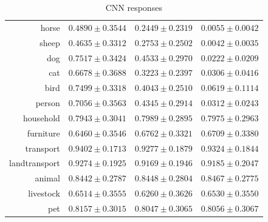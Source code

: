 \documentclass[11pt,a4paper]{article}
\begin{document}
\begin{table}[htbp]
\begin{tabular}{r|c|c|c}
horse         & $0.4890\pm0.3544$ & $0.2449\pm0.2319$ & $0.0055\pm0.0042$\\
sheep         & $0.4635\pm0.3312$ & $0.2753\pm0.2502$ & $0.0042\pm0.0035$\\
dog           & $0.7517\pm0.3424$ & $0.4533\pm0.2970$ & $0.0222\pm0.0209$\\
cat           & $0.6678\pm0.3688$ & $0.3223\pm0.2397$ & $0.0306\pm0.0416$\\
bird          & $0.7499\pm0.3318$ & $0.4043\pm0.2510$ & $0.0619\pm0.1114$\\
person        & $0.7056\pm0.3563$ & $0.4345\pm0.2914$ & $0.0312\pm0.0243$\\\hline
household     & $0.7943\pm0.3041$ & $0.7989\pm0.2895$ & $0.7975\pm0.2963$\\
furniture     & $0.6460\pm0.3546$ & $0.6762\pm0.3321$ & $0.6709\pm0.3380$\\
transport     & $0.9402\pm0.1713$ & $0.9277\pm0.1879$ & $0.9324\pm0.1844$\\
landtransport & $0.9274\pm0.1925$ & $0.9169\pm0.1946$ & $0.9185\pm0.2047$\\
animal        & $0.8442\pm0.2787$ & $0.8448\pm0.2804$ & $0.8467\pm0.2775$\\
livestock     & $0.6514\pm0.3555$ & $0.6260\pm0.3626$ & $0.6530\pm0.3550$\\
pet           & $0.8157\pm0.3015$ & $0.8047\pm0.3065$ & $0.8056\pm0.3067$
\end{tabular}
\caption{CNN responses}
\label{tab:cnnresp}
\end{table}
\end{document}
